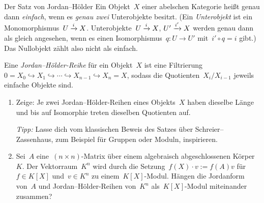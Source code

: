 \documentclass{uebblatt}
\begin{document}
\begin{aufgabe}{Der Satz von Jordan--Hölder}
Ein Objekt~$X$ einer abelschen Kategorie heißt genau dann \emph{einfach}, wenn
es \emph{genau zwei} Unterobjekte besitzt. (Ein \emph{Unterobjekt} ist ein
Monomorphismus~$U \xrightarrow{i} X$. Unterobjekte~$U \xrightarrow{i} X$, $U' \xrightarrow{i'} X$
werden genau dann als gleich angesehen, wenn es einen Isomorphismus~$q : U \to
U'$ mit~$i' \circ q = i$ gibt.) Das Nullobjekt zählt also nicht als einfach.

Eine \emph{Jordan--Hölder-Reihe} für ein Objekt~$X$ ist eine Filtrierung
$0 = X_0 \hookrightarrow X_1 \hookrightarrow \cdots \hookrightarrow X_{n-1}
\hookrightarrow X_n = X$, sodass die Quotienten~$X_i/X_{i-1}$ jeweils einfache
Objekte sind.
\begin{enumerate}
\item Zeige: Je zwei Jordan--Hölder-Reihen eines Objekts~$X$ haben dieselbe
Länge und bis auf Isomorphie treten dieselben Quotienten auf.

\emph{Tipp:} Lasse dich vom klassischen Beweis des Satzes über
Schreier--Zassenhaus, zum Beispiel für Gruppen oder Moduln, inspirieren.
\item Sei~$A$ eine~$(n \times n)$-Matrix über einem algebraisch abgeschlossenen
Körper~$K$. Der Vektorraum~$K^n$ wird durch die Setzung~$f(X) \cdot v := f(A)v$
für~$f \in K[X]$ und~$v \in K^n$ zu einem~$K[X]$-Modul. Hängen die
Jordanform von~$A$ und Jordan--Hölder-Reihen von~$K^n$ als~$K[X]$-Modul
miteinander zusammen?
\end{enumerate}
\end{aufgabe}
\end{document}
